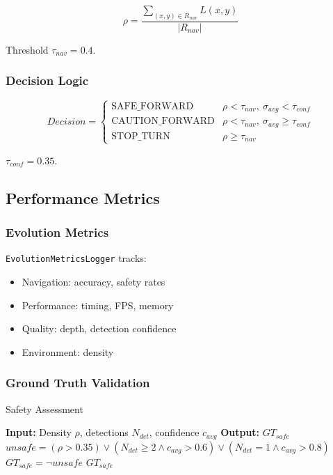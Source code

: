 \documentclass[12pt,oneside]{book}
\begin{document}
\begin{equation}
\rho = \frac{\sum_{(x,y) \in R_{nav}} L(x,y)}{|R_{nav}|}
\label{eq:obstacle_density_detailed}
\end{equation}

Threshold $\tau_{nav}=0.4$.

\subsubsection{Decision Logic}

\begin{equation}
Decision =
\begin{cases}
\text{SAFE\_FORWARD} & \rho < \tau_{nav}, \ \sigma_{avg} < \tau_{conf} \\
\text{CAUTION\_FORWARD} & \rho < \tau_{nav}, \ \sigma_{avg} \geq \tau_{conf} \\
\text{STOP\_TURN} & \rho \geq \tau_{nav}
\end{cases}
\label{eq:navigation_decision_detailed}
\end{equation}

$\tau_{conf}=0.35$.

\subsection{Performance Metrics}

\subsubsection{Evolution Metrics}

\texttt{EvolutionMetricsLogger} tracks:
\begin{itemize}
\item Navigation: accuracy, safety rates
\item Performance: timing, FPS, memory
\item Quality: depth, detection confidence
\item Environment: density
\end{itemize}

\subsubsection{Ground Truth Validation}

\begin{algorithm}
\caption{Safety Assessment}
\begin{algorithmic}
\STATE \textbf{Input:} Density $\rho$, detections $N_{det}$, confidence $c_{avg}$
\STATE \textbf{Output:} $GT_{safe}$
\STATE $unsafe = (\rho>0.35) \lor (N_{det}\geq2 \land c_{avg}>0.6) \lor (N_{det}=1 \land c_{avg}>0.8)$
\STATE $GT_{safe} = \neg unsafe$
\RETURN $GT_{safe}$
\end{algorithmic}
\end{algorithm}
\end{document}
